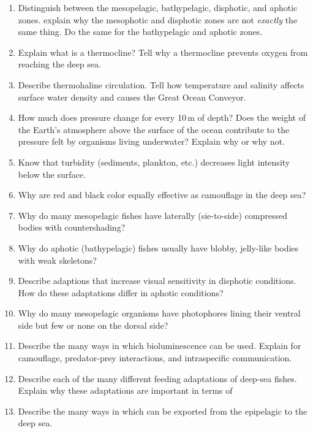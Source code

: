 \documentclass[nofonts, letterpaper]{tufte-handout}
\renewcommand{\smallcapsspacing}[1]{{\addfontfeature{LetterSpace=5.0}#1}}
\renewcommand{\textsc}[1]{\smallcapsspacing{\textsmallcaps{#1}}}
\begin{document}
\begin{enumerate}

\item
  Distinguish between the mesopelagic, bathypelagic, disphotic, and aphotic zones. 
  explain why the mesophotic and disphotic zones are not \emph{exactly} the same thing.
  Do the same for the bathypelagic and aphotic zones.

\item
  Explain what is a thermocline? Tell why a thermocline prevents oxygen from 
  reaching the deep sea.
  
\item
  Describe thermohaline circulation. Tell 
  how temperature and salinity affects surface water density and causes the Great Ocean Conveyor.

\item
  How much does pressure change for every 10\,m of depth? Does the weight of the
  Earth's atmosphere above the surface of the ocean contribute to the pressure felt
  by organisms living underwater? Explain why or why not.

\item
  Know that turbidity (sediments, plankton, etc.) decreases light intensity below the surface.

\item
  Why are red and black color equally effective as camouflage in the deep sea?

\item
  Why do many mesopelagic fishes have laterally (sie-to-side) compressed bodies with
  countershading?
  
\item
	Why do aphotic (bathypelagic) fishes usually have blobby, jelly-like bodies with
	weak skeletons?
	
\item
	Describe adaptions that increase visual sensitivity in disphotic conditions. How
	do these adaptations differ in aphotic conditions?


\item
  	Why do many mesopelagic organisms have photophores lining their ventral side but
  	few or none on the dorsal side?
  	
\item
  	Describe the many ways in which bioluminescence can be used. Explain for
  	camouflage, predator-prey interactions, and intraspecific communication.
  	
\item
	Describe each of the many different feeding adaptations of deep-sea fishes. Explain
	why these adaptations are important in terms of \textsc{npp.}
  
\item
	Describe the many ways in which \textsc{npp} can be exported from the epipelagic to
	the deep sea.

 
 \end{enumerate}
\end{document}
